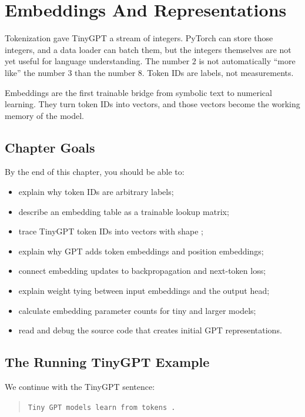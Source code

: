 \chapter{Embeddings And Representations}

Tokenization gave TinyGPT a stream of integers. PyTorch can store those integers, and a data loader can batch them, but the integers themselves are not yet useful for language understanding. The number \(2\) is not automatically ``more like'' the number \(3\) than the number \(8\). Token IDs are labels, not measurements.

Embeddings are the first trainable bridge from symbolic text to numerical learning. They turn token IDs into vectors, and those vectors become the working memory of the model.

\section{Chapter Goals}

By the end of this chapter, you should be able to:

\begin{itemize}
  \item explain why token IDs are arbitrary labels;
  \item describe an embedding table as a trainable lookup matrix;
  \item trace TinyGPT token IDs into vectors with shape \shape{[B,T,C]};
  \item explain why GPT adds token embeddings and position embeddings;
  \item connect embedding updates to backpropagation and next-token loss;
  \item explain weight tying between input embeddings and the output head;
  \item calculate embedding parameter counts for tiny and larger models;
  \item read and debug the source code that creates initial GPT representations.
\end{itemize}

\section{The Running TinyGPT Example}

We continue with the TinyGPT sentence:

\begin{quote}
\texttt{Tiny GPT models learn from tokens .}
\end{quote}

